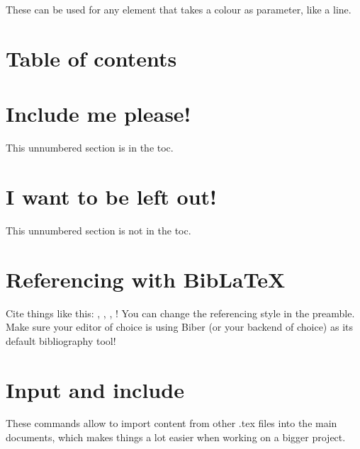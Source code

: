 \documentclass[12pt, letterpaper]{article} %
\begin{document}
These can be used for any element that takes a colour as parameter, like a line.

\noindent {\color{TealBlue} \rule{\linewidth}{1mm}} %

\clearpage
\section{Table of contents}

\tableofcontents


\section*{Include me please!}

This unnumbered section is in the toc.

\section*{I want to be left out!}

This unnumbered section is not in the toc.

\clearpage

\section{Referencing with BibLaTeX}

Cite things like this: 
\cite{dirac}, 
\cite{einstein}, 
\cite{knuth-fa}, 
\cite{knuthwebsite}! You can change the referencing style in the preamble. 
Make sure your editor of choice is using Biber (or your backend of choice) 
as its default bibliography tool!

\printbibliography

\clearpage

\section{Input and include}

These commands allow to import content from other .tex files into the main 
documents, which makes things a lot easier when working on a bigger project.


\end{document}
